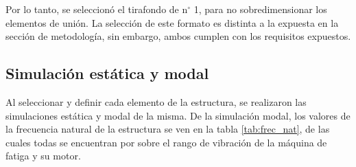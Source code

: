 \begin{table}[h]
\centering
{}
\caption{Esfuerzos admisibles y factor de seguridad para distintas longitudes de tirafondo.}
\label{tab:res_tirafondos}
\end{table}

Por lo tanto, se seleccionó el tirafondo de n$^{\circ}$ 1, para no sobredimensionar los elementos de unión. La selección de este formato es distinta a la expuesta en la sección de metodología, sin embargo, ambos cumplen con los requisitos expuestos. 


\subsection{Simulación estática y modal}

Al seleccionar y definir cada elemento de la estructura, se realizaron las simulaciones estática y modal de la misma. De la simulación modal, los valores de la frecuencia natural de la estructura se ven en la tabla \ref{tab:frec_nat}, de las cuales todas se encuentran por sobre el rango de vibración de la máquina de fatiga y su motor.

